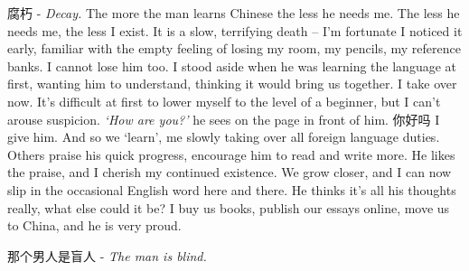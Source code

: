 \begin{CJK*}{UTF8}{gbsn}
腐朽\hspace{3pt} - \textit{Decay.} The more the man learns Chinese the less he needs me. The less he needs me, the less I exist. It is a slow, terrifying death -- I’m fortunate I noticed it early, familiar with the empty feeling of losing my room, my pencils, my reference banks. I cannot lose him too. I stood aside when he was learning the language at first, wanting him to understand, thinking it would bring us together. I take over now. It’s difficult at first to lower myself to the level of a beginner, but I can’t arouse suspicion. \textit{‘How are you?’} he sees on the page in front of him. 你好吗\hspace{3pt} I give him. And so we ‘learn’, me slowly taking over all foreign language duties. Others praise his quick progress, encourage him to read and write more. He likes the praise, and I cherish my continued existence. We grow closer, and I can now slip in the occasional English word here and there. He thinks it’s all his thoughts really, what else could it be? I buy us books, publish our essays online, move us to China, and he is very proud.

那个男人是盲人\hspace{3pt} - \textit{The man is blind.}

\end{CJK*}